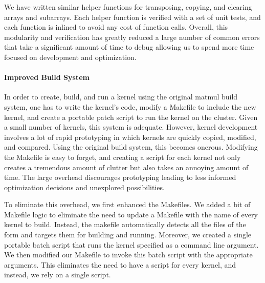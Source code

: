 We have written similar helper functions for transposing, copying, and clearing
arrays and subarrays. Each helper function is verified with a set of unit
tests, and each function is inlined to avoid any cost of function calls.
Overall, this modularity and verification has greatly reduced a large number of
common errors that take a significant amount of time to debug allowing us to
spend more time focused on development and optimization.

\paragraph{Improved Build System}
In order to create, build, and run a kernel using the original matmul build
system, one has to write the kernel's code, modify a Makefile to include the
new kernel, and create a portable patch script to run the kernel on the
cluster. Given a small number of kernels, this system is adequate. However,
kernel development involves a lot of rapid prototyping in which kernels are
quickly copied, modified, and compared. Using the original build system, this
becomes onerous. Modifying the Makefile is easy to forget, and creating a
script for each kernel not only creates a tremendous amount of clutter but also
takes an annoying amount of time. The large overhead discourages prototyping
leading to less informed optimization decisions and unexplored possibilities.

To eliminate this overhead, we first enhanced the Makefiles. We added a bit of
Makefile logic to eliminate the need to update a Makefile with the name of
every kernel to build. Instead, the makefile automatically detects all the
files of the form  and targets them for building and
running. Moreover, we created a single portable batch script that runs the
kernel specified as a command line argument. We then modified our Makefile to
invoke this batch script with the appropriate arguments. This eliminates the
need to have a script for every kernel, and instead, we rely on a single
script.
